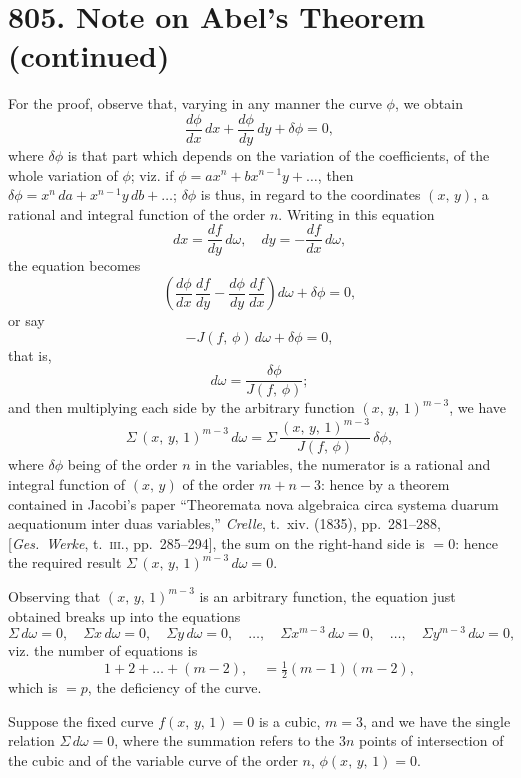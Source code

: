\documentclass[11pt,a4paper]{book}
\begin{document}
\newpage
\section*{805. Note on Abel's Theorem (continued)}

For the proof, observe that, varying in any manner the curve $\phi$, we obtain
\[
\frac{d\phi}{dx}\,dx + \frac{d\phi}{dy}\,dy + \delta\phi = 0,
\]
where $\delta\phi$ is that part which depends on the variation of the coefficients, of the whole variation of $\phi$; viz. if $\phi = ax^n + bx^{n-1}y + \ldots$, then $\delta\phi = x^n\,da + x^{n-1}y\,db + \ldots$; $\delta\phi$ is thus, in regard to the coordinates $(x,\,y)$, a rational and integral function of the order $n$. Writing in this equation
\[
dx = \frac{df}{dy}\,d\omega,\quad dy = -\frac{df}{dx}\,d\omega,
\]
the equation becomes
\[
\left(\frac{d\phi}{dx}\,\frac{df}{dy} - \frac{d\phi}{dy}\,\frac{df}{dx}\right) d\omega + \delta\phi = 0,
\]
or say
\[
-J(f,\,\phi)\,d\omega + \delta\phi = 0,
\]
that is,
\[
d\omega = \frac{\delta\phi}{J(f,\,\phi)};
\]
and then multiplying each side by the arbitrary function $(x,\,y,\,1)^{m-3}$, we have
\[
\Sigma\,(x,\,y,\,1)^{m-3}\,d\omega = \Sigma\,\frac{(x,\,y,\,1)^{m-3}}{J(f,\,\phi)}\,\delta\phi,
\]
where $\delta\phi$ being of the order $n$ in the variables, the numerator is a rational and integral function of $(x,\,y)$ of the order $m+n-3$: hence by a theorem contained in Jacobi's paper ``Theoremata nova algebraica circa systema duarum aequationum inter duas variables,'' \textit{Crelle}, t.~xiv. (1835), pp.~281--288, [\textit{Ges.\ Werke}, t.~\textsc{iii.}, pp.~285--294], the sum on the right-hand side is $=0$: hence the required result $\Sigma\,(x,\,y,\,1)^{m-3}\,d\omega = 0$.

Observing that $(x,\,y,\,1)^{m-3}$ is an arbitrary function, the equation just obtained breaks up into the equations
\[
\Sigma\,d\omega = 0,\quad \Sigma x\,d\omega = 0,\quad \Sigma y\,d\omega = 0,\quad \ldots,\quad \Sigma x^{m-3}\,d\omega = 0,\quad \ldots,\quad \Sigma y^{m-3}\,d\omega = 0,
\]
viz. the number of equations is
\[
1 + 2 + \ldots + (m-2),\quad = \tfrac{1}{2}(m-1)(m-2),
\]
which is $=p$, the deficiency of the curve.

Suppose the fixed curve $f(x,\,y,\,1)=0$ is a cubic, $m=3$, and we have the single relation $\Sigma\,d\omega = 0$, where the summation refers to the $3n$ points of intersection of the cubic and of the variable curve of the order $n$, $\phi(x,\,y,\,1)=0$.
\end{document}
